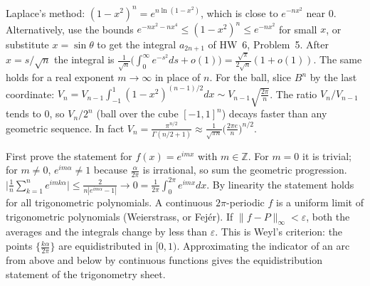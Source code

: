 \documentclass[11pt,a4paper]{article}
\begin{document}
 Laplace's method: $(1-x^2)^n=e^{n\ln(1-x^2)}$, which is close to $e^{-nx^2}$ near $0$. Alternatively, use the bounds $e^{-nx^2-nx^4}\le(1-x^2)^n\le e^{-nx^2}$ for small $x$, or substitute $x=\sin\theta$ to get the integral $a_{2n+1}$ of HW~6, Problem~5.
 After $x=s/\sqrt n$ the integral is $\frac1{\sqrt n}\bigl(\int_0^\infty e^{-s^2}ds+o(1)\bigr)=\frac{\sqrt\pi}{2\sqrt n}(1+o(1))$. The same holds for a real exponent $m\to\infty$ in place of $n$.
 For the ball, slice $B^n$ by the last coordinate: $V_n=V_{n-1}\int_{-1}^1(1-x^2)^{(n-1)/2}dx\sim V_{n-1}\sqrt{\frac{2\pi}{n}}$. The ratio $V_n/V_{n-1}$ tends to $0$, so $V_n/2^n$ (ball over the cube $[-1,1]^n$) decays faster than any geometric sequence. In fact $V_n=\frac{\pi^{n/2}}{\Gamma(n/2+1)}\approx\frac{1}{\sqrt{\pi n}}\bigl(\frac{2\pi e}{n}\bigr)^{n/2}$.

 First prove the statement for $f(x)=e^{imx}$ with $m\in\mathbb Z$. For $m=0$ it is trivial; for $m\ne0$, $e^{im\alpha}\ne1$ because $\frac\alpha{2\pi}$ is irrational, so sum the geometric progression.
 $\bigl|\frac1n\sum_{k=1}^ne^{imk\alpha}\bigr|\le\frac{2}{n|e^{im\alpha}-1|}\to0=\frac1{2\pi}\int_0^{2\pi}e^{imx}dx$. By linearity the statement holds for all trigonometric polynomials.
 A continuous $2\pi$-periodic $f$ is a uniform limit of trigonometric polynomials (Weierstrass, or Fej\'er). If $\|f-P\|_\infty<\varepsilon$, both the averages and the integrals change by less than $\varepsilon$. This is Weyl's criterion: the points $\{\frac{k\alpha}{2\pi}\}$ are equidistributed in $[0,1)$. Approximating the indicator of an arc from above and below by continuous functions gives the equidistribution statement of the trigonometry sheet.
\end{document}
